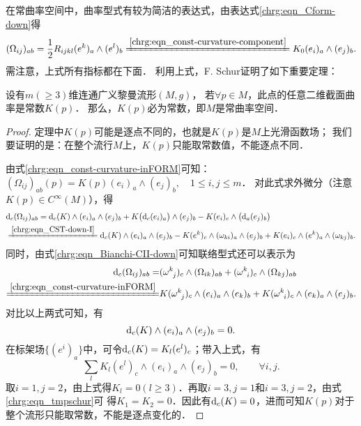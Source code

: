 在常曲率空间中，曲率型式有较为简洁的表达式，由表达式\eqref{chrg:eqn_Cform-down}得
\begin{equation}\label{chrg:eqn_const-curvature-inFORM}
    (\Omega_{ij})_{ab} = \frac{1}{2}R_{ijkl} (e^k)_a \wedge (e^l)_b
    \xlongequal{\ref{chrg:eqn_const-curvature-component}}
    K_0 (e_i)_a \wedge (e_j)_b .
\end{equation}
需注意，上式所有指标都在下面．
利用上式，F. Schur证明了如下重要定理：
\begin{theorem}\label{chrg:thm_Schur-lemma}
    设有$m(\geqslant 3)$维连通广义黎曼流形$(M,g)$，
    若$\forall p\in M$，此点的任意二维截面曲率是常数$K(p)$．
    那么，$K(p)$必为常数，即$M$是常曲率空间．
\end{theorem}
\begin{proof}
    定理中$K(p)$可能是逐点不同的，也就是$K(p)$是$M$上光滑函数场；
    我们要证明的是：在整个流行$M$上，$K(p)$只能取常数值，不能逐点不同．

    由式\eqref{chrg:eqn_const-curvature-inFORM}可知：
    $(\Omega_{ij})_{ab}(p) = K(p) (e_i)_a \wedge (e_j)_b , \quad 1\leqslant i,j \leqslant m$．
    对此式求外微分（注意$K(p)\in C^\infty(M)$），得
    \begin{align*}
        &{\rm d}_c(\Omega_{ij})_{ab} = {\rm d}_c (K)\wedge (e_i)_a \wedge (e_j)_b
        + K \bigl({\rm d}_c(e_i)_a \bigr) \wedge (e_j)_b - K (e_i)_c \wedge \bigl({\rm d}_a (e_j)_b \bigr) \\
        &\xlongequal{\ref{chrg:eqn_CST-down-I}} {\rm d}_c (K)\wedge (e_i)_a \wedge (e_j)_b
        - K (e^k)_c \wedge (\omega_{k i})_a \wedge (e_j)_b
        + K (e_i)_c \wedge (e^k)_a \wedge (\omega_{k j})_b .
    \end{align*}
    同时，由式\eqref{chrg:eqn_Bianchi-CII-down}可知联络型式还可以表示为
    \begin{align*}
      {\rm d}_c (\Omega_{ij})_{ab}  =&  ( \omega _{\hphantom{k} j}^k )_c
      \wedge (\Omega_{i k} )_{ab} + ( \omega _{\hphantom{k} i}^{k} )_c \wedge (\Omega_{k j})_{ab}   \\
      \xlongequal{\ref{chrg:eqn_const-curvature-inFORM}}&
      K( \omega _{\hphantom{k} j}^k )_c \wedge (e_i)_a \wedge (e_k)_b
      +K ( \omega _{\hphantom{k} i}^{k} )_c \wedge (e_k)_a \wedge (e_j)_b .
    \end{align*}
    对比以上两式可知，有
    \begin{equation}
        {\rm d}_c (K)\wedge (e_i)_a \wedge (e_j)_b = 0.
    \end{equation}
    在标架场$\{(e^i)_a\}$中，可令${\rm d}_c (K) = K_l (e^l)_c$；带入上式，有
    \begin{equation}\label{chrg:eqn_tmpschur}
       \sum_{l } K_l (e^l)_c \wedge (e_i)_a \wedge (e_j)_b = 0, \qquad \forall i,j .
    \end{equation}
    取$i=1,j=2$，由上式得$K_l=0(l \geqslant 3)$．再取$i=3,j=1$和$i=3,j=2$，由式\eqref{chrg:eqn_tmpschur}可
    得$K_1=K_2=0$．因此有${\rm d}_c (K) = 0$，进而可知$K(p)$对于整个流形只能取常数，不能是逐点变化的．
\end{proof}


